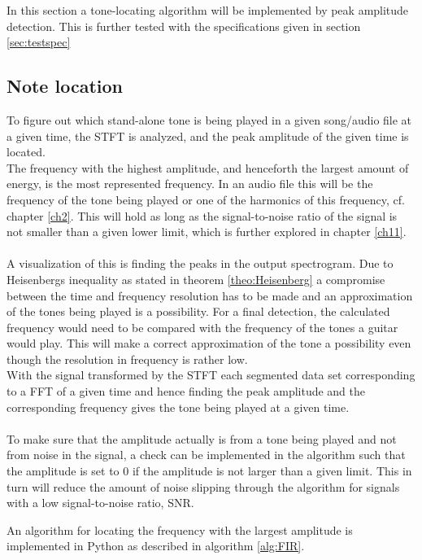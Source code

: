 \label{sec:peak_detection}
In this section a tone-locating algorithm will be implemented by peak amplitude detection.
This is further tested with the specifications given in section \ref{sec:testspec}
\subsection{Note location}
To figure out which stand-alone tone is being played in a given song/audio file at a given time, the STFT is analyzed, and the peak amplitude of the given time is located.\\
The frequency with the highest amplitude, and henceforth the largest amount of energy, is the most represented frequency. 
In an audio file this will be the frequency of the tone being played or one of the harmonics of this frequency, cf. chapter \ref{ch2}.
This will hold as long as the signal-to-noise ratio of the signal is not smaller than a given lower limit, which is further explored in chapter \ref{ch11}.
\\
\\
A visualization of this is finding the peaks in the output spectrogram.
Due to Heisenbergs inequality as stated in theorem \ref{theo:Heisenberg} a compromise between the time and frequency resolution has to be made and an approximation of the tones being played is a possibility.
For a final detection, the calculated frequency would need to be compared with the frequency of the tones a guitar would play.
This will make a correct approximation of the tone a possibility even though the resolution in frequency is rather low.
\\
With the signal transformed by the STFT each segmented data set corresponding to a FFT of a given time and hence finding the peak amplitude and the corresponding frequency gives the tone being played at a given time.
\\\\
To make sure that the amplitude actually is from a tone being played and not from noise in the signal, a check can be implemented in the algorithm such that the amplitude is set to $0$ if the amplitude is not larger than a given limit.
This in turn will reduce the amount of noise slipping through the algorithm for signals with a low signal-to-noise ratio, SNR.

An algorithm for locating the frequency with the largest amplitude is implemented in Python as described in algorithm \ref{alg:FIR}.

